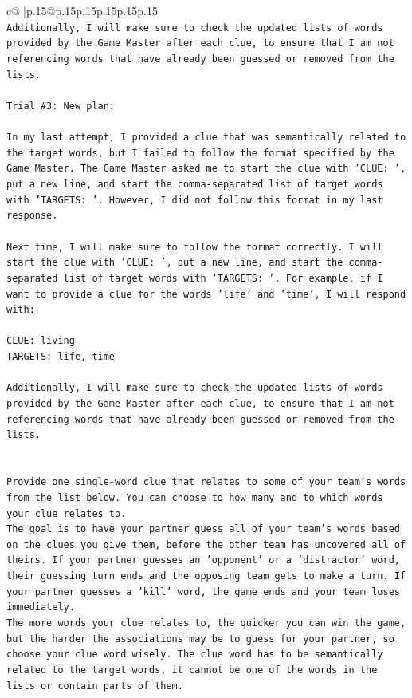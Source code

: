 \documentclass{article}
\begin{document}
{\begin{supertabular}{c@{$\;$}|p{.15\linewidth}@{}p{.15\linewidth}p{.15\linewidth}p{.15\linewidth}p{.15\linewidth}p{.15\linewidth}}
{{{\\ 
\texttt{Additionally, I will make sure to check the updated lists of words provided by the Game Master after each clue, to ensure that I am not referencing words that have already been guessed or removed from the lists.} \\
\\ 
\texttt{Trial \#3: New plan: } \\
\\ 
\texttt{In my last attempt, I provided a clue that was semantically related to the target words, but I failed to follow the format specified by the Game Master. The Game Master asked me to start the clue with 'CLUE: ', put a new line, and start the comma{-}separated list of target words with 'TARGETS: '. However, I did not follow this format in my last response. } \\
\\ 
\texttt{Next time, I will make sure to follow the format correctly. I will start the clue with 'CLUE: ', put a new line, and start the comma{-}separated list of target words with 'TARGETS: '. For example, if I want to provide a clue for the words 'life' and 'time', I will respond with:} \\
\\ 
\texttt{CLUE: living} \\
\texttt{TARGETS: life, time} \\
\\ 
\texttt{Additionally, I will make sure to check the updated lists of words provided by the Game Master after each clue, to ensure that I am not referencing words that have already been guessed or removed from the lists.} \\
\\ 
\\ 
\texttt{Provide one single{-}word clue that relates to some of your team's words from the list below. You can choose to how many and to which words your clue relates to.} \\
\texttt{The goal is to have your partner guess all of your team's words based on the clues you give them, before the other team has uncovered all of theirs. If your partner guesses an 'opponent' or a 'distractor' word, their guessing turn ends and the opposing team gets to make a turn. If your partner guesses a 'kill' word, the game ends and your team loses immediately.} \\
\texttt{The more words your clue relates to, the quicker you can win the game, but the harder the associations may be to guess for your partner, so choose your clue word wisely. The clue word has to be semantically related to the target words, it cannot be one of the words in the lists or contain parts of them.} \\
}}}
\end{supertabular}}
\end{document}
